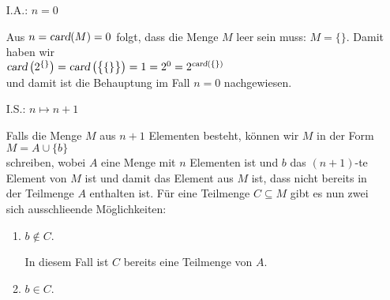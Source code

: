 \begin{enumerate}
\item[I.A.:] $n = 0$

     Aus $n = \textsl{card}(M) = 0$ folgt, dass die Menge $M$ leer sein muss: $M = \{\}$.
     Damit haben wir
     \\[0.2cm]
     \hspace*{1.3cm}
     $\textsl{card}\left(2^{\{\}}\right) = \textsl{card}\left(\bigl\{ \{\} \bigr\}\right)
       = 1 = 2^0 = 2^{\textsl{card}(\{\})}
     $
     \\[0.2cm]
     und damit ist die Behauptung im Fall $n = 0$ nachgewiesen.
\item[I.S.:] $n \mapsto n + 1$

     Falls die Menge $M$ aus $n+1$ Elementen besteht, k\"{o}nnen wir $M$ in der Form
     \\[0.2cm]
     \hspace*{1.3cm}
     $M = A \cup \{ b \}$
     \\[0.2cm]
     schreiben, wobei $A$ eine Menge mit $n$ Elementen ist und $b$ das $(n+1)$-te Element
     von $M$ ist und damit das Element aus $M$ ist, dass nicht bereits in der Teilmenge
     $A$ enthalten ist. 
     F\"{u}r eine Teilmenge $C \subseteq M$ gibt es nun zwei sich ausschlie\3ende M\"{o}glichkeiten:  
     \begin{enumerate}
     \item $b \not\in C$.
       
           In diesem Fall ist $C$ bereits eine Teilmenge von $A$.
     \item $b \in C$.


\end{enumerate}
\end{enumerate}
